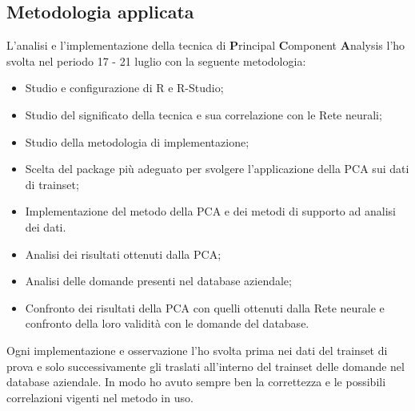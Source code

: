 \subsection{Metodologia applicata}
\label{Metodologia applicata}
L'analisi e l'implementazione della tecnica di \textbf{P}rincipal \textbf{C}omponent \textbf{A}nalysis l'ho svolta nel periodo 17 - 21 luglio con la seguente metodologia:
\begin{itemize}
\item Studio e configurazione di R e R-Studio;
\item Studio del significato della tecnica e sua correlazione con le Rete neurali;
\item Studio della metodologia di implementazione;
\item Scelta del package pi\`u adeguato per svolgere l'applicazione della PCA sui dati di trainset;
\item Implementazione del metodo della PCA  e dei metodi di supporto ad analisi dei dati.
\item Analisi dei risultati ottenuti dalla PCA;
\item Analisi delle domande presenti nel database aziendale;
\item Confronto dei risultati della PCA con quelli ottenuti dalla Rete neurale e confronto della loro validit\`a con le domande del database.
\end{itemize}
\noindent
Ogni implementazione  e osservazione l'ho svolta prima nei dati del trainset di prova e solo successivamente gli traslati all'interno del trainset delle domande nel database aziendale. In modo ho avuto sempre ben la correttezza e le possibili correlazioni vigenti nel metodo in uso.

